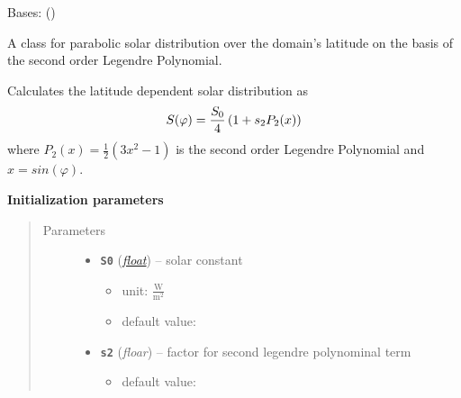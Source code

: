 \documentclass[a4paper,10pt,english]{sphinxmanual}
\begin{document}

\begin{fulllineitems}
\label{api/climlab.radiation:climlab.radiation.insolation.P2Insolation}
Bases: {\hyperref[api/climlab.radiation:climlab.radiation.insolation._Insolation]{\emph{}}} ()

A class for parabolic solar distribution over the domain's latitude 
on the basis of the second order Legendre Polynomial.

Calculates the latitude dependent solar distribution as
\begin{gather}
\begin{split}S(\varphi) = \frac{S_0}{4} \left( 1 + s_2 P_2(x) \right)\end{split}\notag
\end{gather}
where \(P_2(x) = \frac{1}{2} (3x^2 - 1)\) is the second order Legendre Polynomial
and \(x=sin(\varphi)\).

\textbf{Initialization parameters}
\begin{quote}\begin{description}
\item[{Parameters}] \leavevmode\begin{itemize}
\item {} 
\textbf{\texttt{S0}} (\href{http://docs.python.org/2.7/library/functions.html\#float}{\emph{float}}) -- 
solar constant
\begin{itemize}
\item {} 
unit: \(\frac{\textrm{W}}{\textrm{m}^2}\)

\item {} 
default value: 

\end{itemize}


\item {} 
\textbf{\texttt{s2}} (\emph{floar}) -- 
factor for second legendre polynominal term
\begin{itemize}
\item {} 
default value: 

\end{itemize}


\end{itemize}


\end{description}
\end{quote}
\end{fulllineitems}
\end{document}
